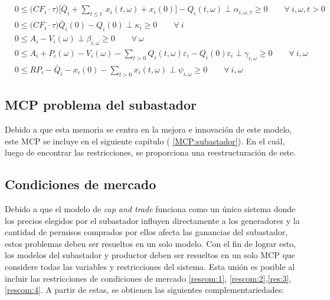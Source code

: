 \begin{footnotesize}
\begin{align}
    & 0 \leq \big(CF_i \cdot \tau \big) \Bigg[\bar{Q}_i + \sum_{t\leq t^{\prime}} x_i(t,\omega) + x_i(0) \Bigg] - Q_i(t,\omega)  \perp \alpha_{i,\omega,\tau} \geq 0 \qquad \forall \ i, \omega, t  > 0\\
    & 0 \leq \Big(CF_i\cdot\tau \Big)\bar{Q}_i(0)-Q_{i}(0) \perp \kappa_i \geq 0 \qquad \forall \ i \\
    & 0 \leq  A_{i} - V_i(\omega) \perp \beta_{i,\omega} \geq 0 \qquad \forall  \ \omega \\
    & 0 \leq  A_{i} + P_{i} (\omega) - V_i(\omega) - \sum_{t>0} Q_i(t,\omega) \varepsilon_{i} -Q_i(0)\varepsilon_{i} \perp \gamma_{i,\omega} \geq 0 \qquad \forall \ i, \omega\\
    & 0 \leq  RP_i - \bar{Q}_i - x_i(0) - \sum_{t>0} x_i(t,\omega) \perp \psi_{i,\omega} \geq 0 \qquad \forall \ i,\omega 
\end{align}

\end{footnotesize}


\subsection{MCP problema del subastador}

Debido a que esta memoria se centra en la mejora e innovación de este modelo, este MCP se incluye en el siguiente capítulo ( \ref{MCP:subastador}). En el cuál, luego de encontrar las restricciones, se proporciona una reestructuración de este. 

\subsection{Condiciones de mercado}\label{MCPmercado}

Debido a que el modelo de \textit{cap and trade} funciona como un único sistema donde los precios elegidos por el subastador influyen directamente a los generadores y la cantidad de permisos comprados por ellos afecta las ganancias del subastador, estos problemas deben ser resueltos en un solo modelo. Con el fin de lograr esto, los modelos del subastador y productor deben ser resueltos en un solo MCP que considere todas las variables y restricciones del sistema. Esta unión es posible al incluir las restricciones de condiciones de mercado \ref{rescom:1}, \ref{rescom:2},\ref{res:3},\ref{rescom:4}. A partir de estas, se obtienen las siguientes complementariedades:

